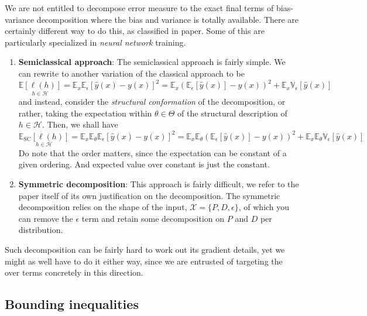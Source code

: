 \documentclass[10pt]{article}
\begin{document}
We are not entitled to decompose error measure to the exact final terms of bias-variance decomposition where the bias and variance is totally available. There are certainly different way to do this, as classified in \cite{adlam2020understandingdoubledescentrequires} paper. Some of this are particularly specialized in \textit{neural network} training. 
\begin{enumerate}[leftmargin=1cm,itemsep=2pt,topsep=1pt]
    \item \textbf{Semiclassical approach}: The semiclassical approach is fairly simple. We can rewrite to another variation of the classical approach to be \begin{equation}
        \underset{h\in\mathcal{H}}{\mathbb{E}[\ell(h)]} = \mathbb{E}_{x}\mathbb{E}_{\epsilon}\left[\hat{y}(x)-y(x)\right]^{2} = \mathbb{E}_{x}\left(\mathbb{E}_{\epsilon}[\hat{y}(x)]-y(x)\right)^{2} + \mathbb{E}_{x}\mathbb{V}_{\epsilon}\left[\hat{y}(x)\right]  
    \end{equation}
    and instead, consider the \textit{structural conformation} of the decomposition, or rather, taking the expectation within $\theta\in \Theta$ of the structural description of $h\in\mathcal{H}$. Then, we shall have 
    \begin{equation}
        \underset{h\in\mathcal{H}}{\mathbb{E}_{\mathrm{SC}}[\ell(h)]} = \mathbb{E}_{x}\mathbb{E}_{\theta}\mathbb{E}_{\epsilon}\left[\hat{y}(x)-y(x)\right]^{2} = \mathbb{E}_{x}\mathbb{E}_{\theta}\left(\mathbb{E}_{\epsilon}[\hat{y}(x)]-y(x)\right)^{2} + \mathbb{E}_{x}\mathbb{E}_{\theta}\mathbb{V}_{\epsilon}\left[\hat{y}(x)\right]
    \end{equation}
    Do note that the order matters, since the expectation can be constant of a given ordering. And expected value over constant is just the constant. 
    \item \textbf{Symmetric decomposition}: This approach is fairly difficult, we refer to the paper itself of its own justification on the decomposition. The symmetric decomposition relies on the shape of the input, $\mathcal{X}=\{P,D,\epsilon\}$, of which you can remove the $\epsilon$ term and retain some decomposition on $P$ and $D$ per distribution. 
\end{enumerate}
Such decomposition can be fairly hard to work out its gradient details, yet we might as well have to do it either way, since we are entrusted of targeting the over terms concretely in this direction. 

\subsection{Bounding inequalities}
\end{document}
